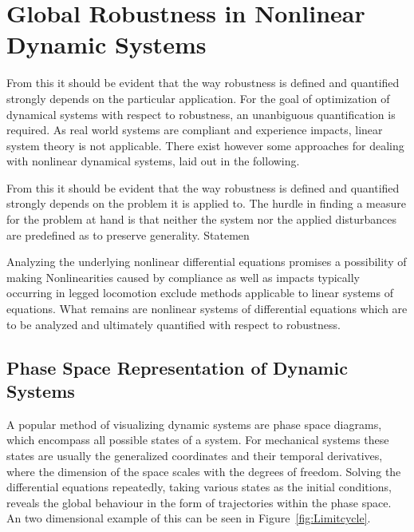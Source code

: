 \section{Global Robustness in Nonlinear Dynamic Systems} \label{Global Robustness}
From this it should be evident that the way robustness is defined and quantified strongly depends on the particular application.
For the goal of optimization of dynamical systems with respect to robustness, an unanbiguous quantification is required. As real world systems are compliant and experience impacts, linear system theory is not applicable. There exist however some approaches for dealing with nonlinear dynamical systems, laid out in the following. 

\iffalse
From this it should be evident that the way robustness is defined and quantified strongly depends on the problem it is applied to. The hurdle in finding a measure for the problem at hand is that neither the system nor the applied disturbances are predefined as to preserve generality. Statemen

Analyzing the underlying nonlinear differential equations promises a possibility of making
Nonlinearities caused by compliance as well as impacts typically occurring in legged locomotion exclude methods applicable to linear systems of equations. 
What remains are nonlinear systems of differential equations which are to be analyzed and ultimately quantified with respect to robustness. 

\subsection{Phase Space Representation of Dynamic Systems} \label{Phase Space}
A popular method of visualizing dynamic systems are phase space diagrams, which encompass all possible states of a system. For mechanical systems these states are usually the generalized coordinates and their temporal derivatives, where the dimension of the space scales with the degrees of freedom. Solving the differential equations repeatedly, taking various states as the initial conditions, reveals the global behaviour in the form of trajectories within the phase space. An two dimensional example of this can be seen in Figure~\ref{fig:Limitcycle}.


